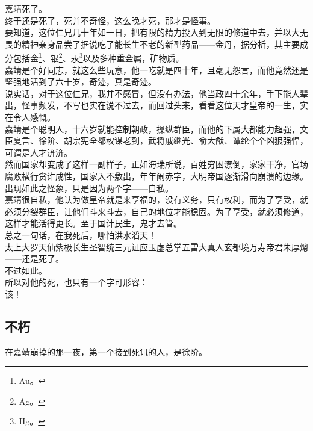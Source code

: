 \begin{multicols}{\theparacolNo}
嘉靖死了。\\

终于还是死了，死并不奇怪，这么晚才死，那才是怪事。\\

要知道，这位仁兄几十年如一日，把有限的精力投入到无限的修道中去，并以大无畏的精神亲身品尝了据说吃了能长生不老的新型药品——金丹，据分析，其主要成分包括金\footnote{Au。}、银\footnote{Ag。}、汞\footnote{Hg。}以及多种重金属，矿物质。\\

嘉靖是个好同志，就这么些玩意，他一吃就是四十年，且毫无怨言，而他竟然还是坚强地活到了六十岁，奇迹，真是奇迹。\\

说实话，对于这位仁兄，我并不感冒，但没有办法，他当政四十余年，手下能人辈出，怪事频发，不写也实在说不过去，而回过头来，看看这位天才皇帝的一生，实在令人感慨。\\

嘉靖是个聪明人，十六岁就能控制朝政，操纵群臣，而他的下属大都能力超强，文臣夏言、徐阶、胡宗宪全都权谋老到，武将戚继光、俞大猷、谭纶个个凶狠强悍，可谓是人才济济。\\

然而国家却变成了这样一副样子，正如海瑞所说，百姓穷困潦倒，家家干净，官场腐败横行贪诈成性，国家入不敷出，年年闹赤字，大明帝国逐渐滑向崩溃的边缘。\\

出现如此之怪象，只是因为两个字——自私。\\

嘉靖很自私，他认为做皇帝就是来享福的，没有义务，只有权利，而为了享受，就必须分裂群臣，让他们斗来斗去，自己的地位才能稳固。为了享受，就必须修道，这样才能活得更长。至于国计民生，鬼才去管。\\

总之一句话，在我死后，哪怕洪水滔天！\\

太上大罗天仙紫极长生圣智统三元证应玉虚总掌五雷大真人玄都境万寿帝君朱厚熜——还是死了。\\

不过如此。\\

所以对他的死，也只有一个字可形容：\\

该！\\

\subsection{不朽}
在嘉靖崩掉的那一夜，第一个接到死讯的人，是徐阶。\\


\end{multicols}
